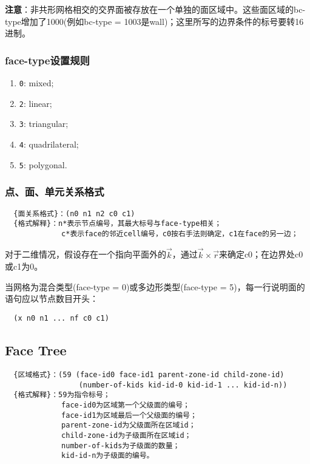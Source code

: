 \documentclass[lang=cn,11pt,a4paper]{elegantpaper}
\begin{document}
\textbf{注意}：非共形网格相交的交界面被存放在一个单独的面区域中。这些面区域的bc-type增加了1000(例如bc-type = 1003是wall)；这里所写的边界条件的标号要转16进制。

\subsubsection{face-type设置规则}\label{face-type}
\begin{enumerate}[label=\arabic*).]
  \item \lstinline{0}: mixed;
  \item \lstinline{2}: linear;
  \item \lstinline{3}: triangular;
  \item \lstinline{4}: quadrilateral;
  \item \lstinline{5}: polygonal.
\end{enumerate}

\subsubsection{点、面、单元关系格式}
\begin{lstlisting}
  {面关系格式}：(n0 n1 n2 c0 c1)
  {格式解释}：n*表示节点编号，其最大标号与face-type相关；
             c*表示face的邻近cell编号，c0按右手法则确定，c1在face的另一边；
\end{lstlisting}

对于二维情况，假设存在一个指向平面外的$\overrightarrow{k}$，通过$\overrightarrow{k}\times\overrightarrow{r}$来确定c0；在边界处c0或c1为0。

当网格为混合类型(face-type = 0)或多边形类型(face-type = 5)，每一行说明面的语句应以节点数目开头：
\begin{lstlisting}
  (x n0 n1 ... nf c0 c1) 
\end{lstlisting}

\subsection{Face Tree}\label{Face-Tree}
\begin{lstlisting}
  {区域格式}：(59 (face-id0 face-id1 parent-zone-id child-zone-id)
                 (number-of-kids kid-id-0 kid-id-1 ... kid-id-n))
  {格式解释}：59为指令标号；
             face-id0为区域第一个父级面的编号；
             face-id1为区域最后一个父级面的编号；
             parent-zone-id为父级面所在区域id；
             child-zone-id为子级面所在区域id；
             number-of-kids为子级面的数量；
             kid-id-n为子级面的编号。
\end{lstlisting}
\end{document}
